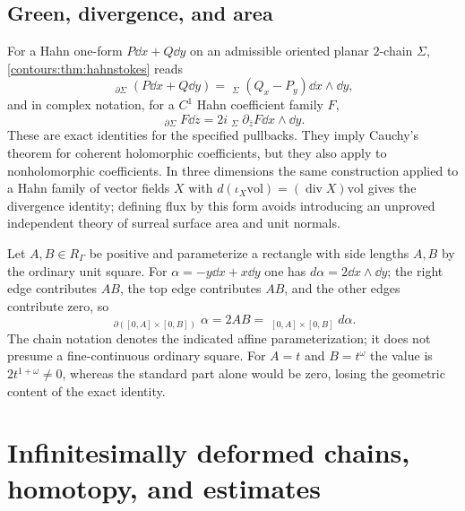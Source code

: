 \documentclass[11pt,letterpaper]{article}
\theoremstyle{definition}
\theoremstyle{remark}
\newcommand{\HInt}{\mathop{\int^{\!H}}\nolimits}
\numberwithin{equation}{section}
\begin{document}
\subsection{Green, divergence, and area}
For a Hahn one-form $P\dd x+Q\dd y$ on an admissible oriented planar $2$-chain
$\Sigma$, \cref{contours:thm:hahnstokes} reads
\begin{equation}\label{contours:eq:green}
  \HInt_{\partial\Sigma}(P\dd x+Q\dd y)
  =\HInt_\Sigma(Q_x-P_y)\dd x\wedge \dd y ,
\end{equation}
and in complex notation, for a $C^1$ Hahn coefficient family $F$,
\begin{equation}\label{contours:eq:cauchygreen}
  \HInt_{\partial\Sigma}F\dd z
  =2i\HInt_\Sigma\partial_{\bar z}F\dd x\wedge \dd y .
\end{equation}
These are exact identities for the specified pullbacks. They imply Cauchy's theorem
for coherent holomorphic coefficients, but they also apply to nonholomorphic
coefficients. In three dimensions the same construction applied to a Hahn family of
vector fields $X$ with $d(\iota_X\mathrm{vol})=(\operatorname{div}X)\mathrm{vol}$
gives the divergence identity; defining flux by this form avoids introducing an
unproved independent theory of surreal surface area and unit normals.

\begin{example}
\label{contours:ex:rectangle}
Let $A,B\in R_\Gamma$ be positive and parameterize a rectangle with side lengths
$A,B$ by the ordinary unit square. For $\alpha=-y\dd x+x\dd y$ one has
$d\alpha=2\dd x\wedge \dd y$; the right edge contributes $AB$, the top edge
contributes $AB$, and the other edges contribute zero, so
\begin{equation}\label{contours:eq:rectangle}
  \HInt_{\partial([0,A]\times[0,B])}\alpha=2AB
  =\HInt_{[0,A]\times[0,B]}d\alpha .
\end{equation}
The chain notation denotes the indicated affine parameterization; it does not
presume a fine-continuous ordinary square. For $A=t$ and $B=t^\omega$ the value is
$2t^{1+\omega}\ne0$, whereas the standard part alone would be zero, losing the
geometric content of the exact identity.
\end{example}

\section{Infinitesimally deformed chains, homotopy, and estimates}
\label{contours:sec:deformed}
\end{document}

